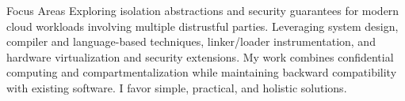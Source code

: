 


%

\begin{cvskills}
  \cvskill
  {Focus Areas}
  {Exploring isolation abstractions and security guarantees for modern cloud workloads involving multiple distrustful parties.
Leveraging system design, compiler and language-based techniques, linker/loader instrumentation, and hardware virtualization and security extensions. My work combines confidential computing and compartmentalization while maintaining backward compatibility with existing software. I favor simple, practical, and holistic solutions.}
\end{cvskills}


